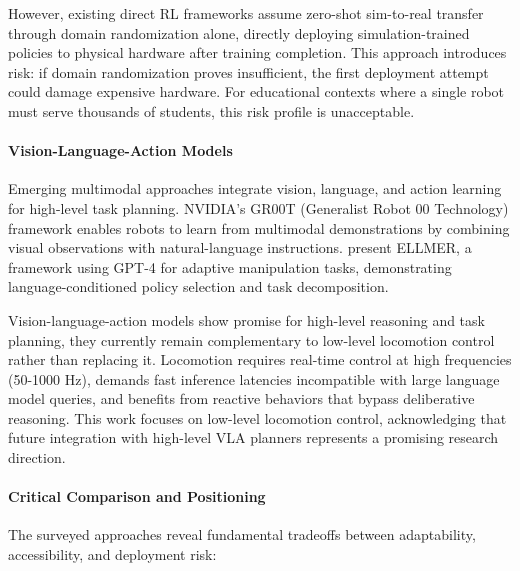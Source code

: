 \documentclass[12pt,a4paper]{article}
\begin{document}
However, existing direct RL frameworks assume zero-shot sim-to-real transfer through domain randomization alone, directly deploying simulation-trained policies to physical hardware after training completion. This approach introduces risk: if domain randomization proves insufficient, the first deployment attempt could damage expensive hardware. For educational contexts where a single robot must serve thousands of students, this risk profile is unacceptable.

\paragraph{Vision-Language-Action Models}

Emerging multimodal approaches integrate vision, language, and action learning for high-level task planning. NVIDIA's GR00T (Generalist Robot 00 Technology) framework enables robots to learn from multimodal demonstrations by combining visual observations with natural-language instructions. \textcite{nature2025llm} present ELLMER, a framework using GPT-4 for adaptive manipulation tasks, demonstrating language-conditioned policy selection and task decomposition.

Vision-language-action models show promise for high-level reasoning and task planning, they currently remain complementary to low-level locomotion control rather than replacing it. Locomotion requires real-time control at high frequencies (50-1000 Hz), demands fast inference latencies incompatible with large language model queries, and benefits from reactive behaviors that bypass deliberative reasoning. This work focuses on low-level locomotion control, acknowledging that future integration with high-level VLA planners represents a promising research direction.

\paragraph{Critical Comparison and Positioning}

The surveyed approaches reveal fundamental tradeoffs between adaptability, accessibility, and deployment risk:
\end{document}
